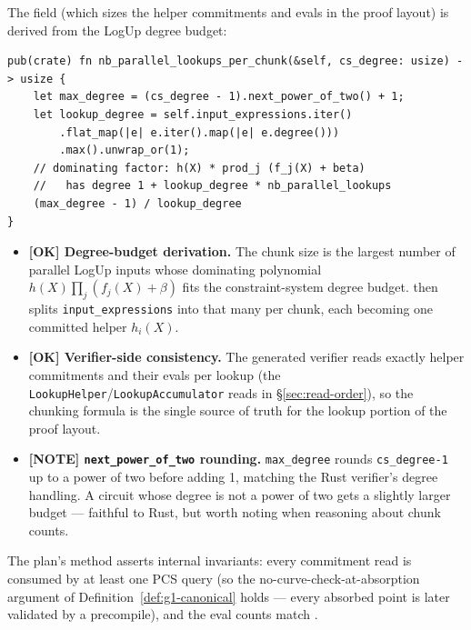 The  field (which sizes the helper commitments and
evals in the proof layout) is derived from the LogUp degree budget:
\begin{lstlisting}[style=rust]
pub(crate) fn nb_parallel_lookups_per_chunk(&self, cs_degree: usize) -> usize {
    let max_degree = (cs_degree - 1).next_power_of_two() + 1;
    let lookup_degree = self.input_expressions.iter()
        .flat_map(|e| e.iter().map(|e| e.degree()))
        .max().unwrap_or(1);
    // dominating factor: h(X) * prod_j (f_j(X) + beta)
    //   has degree 1 + lookup_degree * nb_parallel_lookups
    (max_degree - 1) / lookup_degree
}
\end{lstlisting}
\begin{itemize}
  \item \textcolor{tracegreen}{\textbf{[OK] Degree-budget derivation.}}
        The chunk size is the largest number of parallel LogUp inputs
        whose dominating polynomial $h(X)\prod_j(f_j(X)+\beta)$ fits the
        constraint-system degree budget.  then
        splits \texttt{input\_\allowbreak{}expressions} into that many per chunk,
        each becoming one committed helper $h_i(X)$.
  \item \textcolor{tracegreen}{\textbf{[OK] Verifier-side consistency.}}
        The generated verifier reads exactly  helper
        commitments and their evals per lookup (the
        \texttt{LookupHelper}/\texttt{LookupAccumulator} reads in
        \S\ref{sec:read-order}), so the chunking formula is the single
        source of truth for the lookup portion of the proof layout.
  \item \textcolor{mathpurple}{\textbf{[NOTE] \texttt{next\_\allowbreak{}power\_\allowbreak{}of\_\allowbreak{}two}
        rounding.}} \texttt{max\_degree} rounds \texttt{cs\_degree-1}
        up to a power of two before adding 1, matching the Rust
        verifier's degree handling. A circuit whose degree is not a
        power of two gets a slightly larger budget --- faithful to
        Rust, but worth noting when reasoning about chunk counts.
\end{itemize}

The plan's  method asserts internal invariants: every
commitment read is consumed by at least one PCS query (so the
no-curve-check-at-absorption argument of Definition~\ref{def:g1-canonical}
holds --- every absorbed point is later validated by a precompile), and the
eval counts match .


